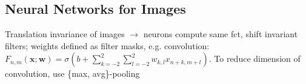 \subsection*{Neural Networks for Images}
Translation invariance of images $\rightarrow$ neurons compute same fct, shift invariant filters; weights defined as filter masks, e.g. convolution: $F_{n,m}(\mathbf{x};\mathbf{w}) = \sigma(b + \sum_{k=-2}^2\sum_{l=-2}^{2}{w_{k,l}x_{n+k,m+l}})$. To reduce dimension of convolution, use \{max, avg\}-pooling

